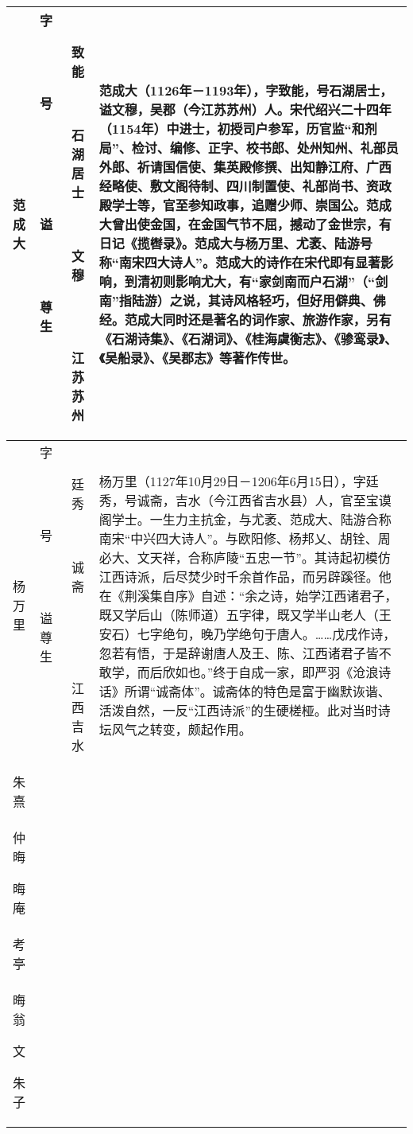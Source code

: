 \begin{longtable}{|>{\centering\namefont\heiti}m{2em}|>{\centering\tiny}m{3.0em}|>{\xzfont\kaiti}m{7.3em}|}
  范成大 & \begin{description}
  \item[字] 致能
  \item[号] 石湖居士
  \item[谥] 文穆
  \item[尊] 
  \item[生] 江苏苏州
  \end{description} & 范成大（1126年－1193年），字致能，号石湖居士，谥文穆，吴郡（今江苏苏州）人。宋代绍兴二十四年（1154年）中进士，初授司户参军，历官监“和剂局”、检讨、编修、正字、校书郎、处州知州、礼部员外郎、祈请国信使、集英殿修撰、出知静江府、广西经略使、敷文阁待制、四川制置使、礼部尚书、资政殿学士等，官至参知政事，追赠少师、崇国公。范成大曾出使金国，在金国气节不屈，撼动了金世宗，有日记《揽辔录》。范成大与杨万里、尤袤、陆游号称“南宋四大诗人”。范成大的诗作在宋代即有显著影响，到清初则影响尤大，有“家剑南而户石湖”（“剑南”指陆游）之说，其诗风格轻巧，但好用僻典、佛经。范成大同时还是著名的词作家、旅游作家，另有《石湖诗集》、《石湖词》、《桂海虞衡志》、《骖鸾录》、《吴船录》、《吴郡志》等著作传世。 \tabularnewline\hline
  杨万里 & \begin{description}
  \item[字] 廷秀
  \item[号] 诚斋
  \item[谥] 
  \item[尊] 
  \item[生] 江西吉水
  \end{description} & 杨万里（1127年10月29日－1206年6月15日），字廷秀，号诚斋，吉水（今江西省吉水县）人，官至宝谟阁学士。一生力主抗金，与尤袤、范成大、陆游合称南宋“中兴四大诗人”。与欧阳修、杨邦乂、胡铨、周必大、文天祥，合称庐陵“五忠一节”。其诗起初模仿江西诗派，后尽焚少时千余首作品，而另辟蹊径。他在《荆溪集自序》自述：“余之诗，始学江西诸君子，既又学后山（陈师道）五字律，既又学半山老人（王安石）七字绝句，晚乃学绝句于唐人。……戊戌作诗，忽若有悟，于是辞谢唐人及王、陈、江西诸君子皆不敢学，而后欣如也。”终于自成一家，即严羽《沧浪诗话》所谓“诚斋体”。诚斋体的特色是富于幽默诙谐、活泼自然，一反“江西诗派”的生硬槎桠。此对当时诗坛风气之转变，颇起作用。 \tabularnewline\hline
  朱熹 & \begin{description}
  \item[字] 元晦\\仲晦
  \item[号] 晦庵\\考亭\\晦翁
  \item[谥] 文
  \item[尊] 朱子

\end{description}
\end{longtable}
